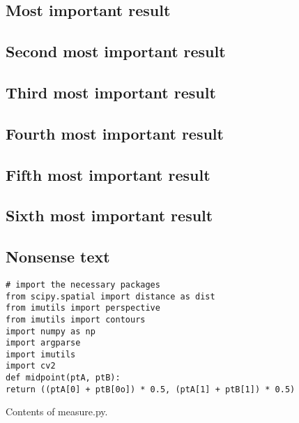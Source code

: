 \documentclass[11pt,letterpaper]{article}
\newenvironment{code}{\captionsetup{type=listing}}{}
\begin{document}
\subsection*{Most important result}
\label{sec:orgda34b1b}


\subsection*{Second most important result}
\label{sec:orga918488}


\subsection*{Third most important result}
\label{sec:org43a685f}



\subsection*{Fourth most important result}
\label{sec:orgac12ade}



\subsection*{Fifth most important result}
\label{sec:orga3a1860}



\subsection*{Sixth most important result}
\label{sec:orga0992ae}

\subsection*{Nonsense text}
\label{sec:org0f982a5}
\lipsum[1-10]

\begin{singlespace}
\begin{code}{}
\label{lst:measureSize}
\begin{verbatim}
# import the necessary packages
from scipy.spatial import distance as dist
from imutils import perspective
from imutils import contours
import numpy as np
import argparse
import imutils
import cv2
def midpoint(ptA, ptB):
return ((ptA[0] + ptB[0o]) * 0.5, (ptA[1] + ptB[1]) * 0.5)
\end{verbatim}
\caption{Contents of measure.py. \label{lst:measureSize}}
\end{code}
\end{singlespace}
\end{document}
